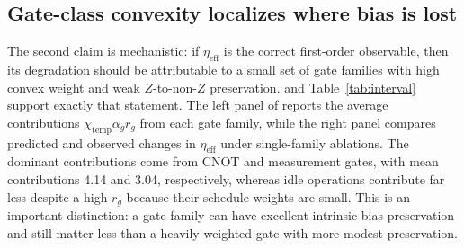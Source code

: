\documentclass{article} %
\begin{document}
\begin{table}[t]
\caption{Predictor comparison across code families. The table reports leave-one-schedule-out RMSE and MAE for threshold prediction under nominal $\eta$ and under $\eta_{\mathrm{eff}}$, together with the resulting improvement percentages and goodness-of-fit statistics. The values show that the renormalized observable improves prediction in every matched code family rather than only for one favored geometry, which is the primary evidence for the main claim in .}
\label{tab:predictor}
\begin{center}
\small
\renewcommand{\arraystretch}{1.1}
\setlength{\tabcolsep}{4pt}
\end{center}
\end{table}

\subsection{Gate-class convexity localizes where bias is lost}

The second claim is mechanistic: if $\eta_{\mathrm{eff}}$ is the correct first-order observable, then its degradation should be attributable to a small set of gate families with high convex weight and weak $Z$-to-non-$Z$ preservation.  and Table~\ref{tab:interval} support exactly that statement. The left panel of  reports the average contributions $\chi_{\mathrm{temp}}\alpha_g r_g$ from each gate family, while the right panel compares predicted and observed changes in $\eta_{\mathrm{eff}}$ under single-family ablations. The dominant contributions come from CNOT and measurement gates, with mean contributions 4.14 and 3.04, respectively, whereas idle operations contribute far less despite a high $r_g$ because their schedule weights are small. This is an important distinction: a gate family can have excellent intrinsic bias preservation and still matter less than a heavily weighted gate with more modest preservation.
\end{document}
